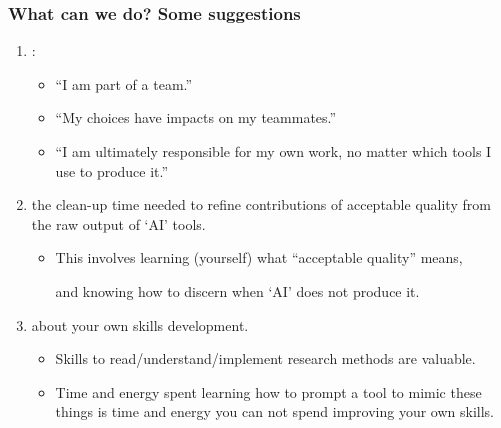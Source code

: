 \documentclass[12pt,aspectratio=169]{beamer}
\begin{document}
\begin{frame}
\frametitle{What can we do? Some suggestions}

\begin{enumerate}
  \item {}:
    \begin{itemize}
      \item “I am part of a team.”
      \item “My choices have impacts on my teammates.”
      \item “I am ultimately responsible for my own work,
      no matter which tools I use to produce it.”
    \end{itemize}
  \item {} the clean-up time needed to refine contributions of acceptable quality from the raw output of ‘AI’ tools.
    \begin{itemize}
      \item This involves learning (yourself) what “acceptable quality” means,

        and knowing how to discern when ‘AI’ does not produce it.
    \end{itemize}
  \item {} about your own skills development.
    \begin{itemize}
      \item Skills to read/understand/implement research methods are valuable.
      \item Time and energy spent learning how to prompt a tool to mimic these things is time and energy you can not spend improving your own skills.
    \end{itemize}
\end{enumerate}
\end{frame}
\end{document}
